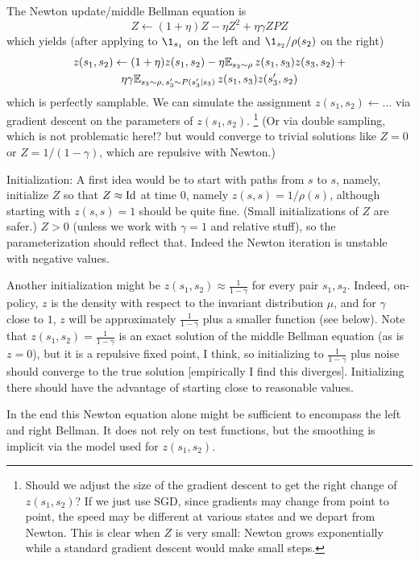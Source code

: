 \documentclass[11pt,a4paper]{article}
\begin{document}
The Newton update/middle Bellman equation is
\begin{equation}
Z\gets (1+\eta)Z-\eta Z^2+\eta \gamma ZPZ
\end{equation}
which yields (after applying to $\1_{s_1}$ on the left and $\1_{s_2}/\rho(s_2)$
on the right)
\begin{multline}
z(s_1,s_2)\gets (1+\eta)z(s_1,s_2)-\eta \mathbb{E}_{s_3\sim \rho}\,
z(s_1,s_3)z(s_3,s_2)\,+\\\eta \gamma \mathbb{E}_{s_3\sim\rho,\, s'_3\sim
P(s'_3|s_3)}\,
z(s_1,s_3)z(s'_3,s_2)
\end{multline}
which is perfectly samplable. We can simulate the assignment
$z(s_1,s_2)\gets...$ via gradient descent on the parameters of
$z(s_1,s_2)$. \footnote{Should we adjust the size of the gradient descent
to get the right change of $z(s_1,s_2)$? If we just use SGD, since
gradients may change from point to point, the speed may be different at
various states and we depart from Newton. This is clear when $Z$ is very
small: Newton grows exponentially while a standard gradient descent would
make small steps.} (Or via double sampling, which is not problematic
here!? but would converge to trivial solutions like $Z=0$ or
$Z=1/(1-\gamma)$, which are repulsive with Newton.)

Initialization: A first idea would be to start with paths from $s$ to
$s$, namely, initialize
$Z$ so that $Z\approx \operatorname{Id}$ at time
$0$, namely $z(s,s)=1/\rho(s)$, although starting with $z(s,s)=1$ should be
quite fine. (Small initializations of $Z$ are safer.) $Z>0$ (unless we
work with $\gamma=1$ and relative stuff), so the parameterization should
reflect that. Indeed the Newton iteration is unstable with negative
values.

Another initialization might be $z(s_1,s_2)\approx \frac{1}{1-\gamma}$
for every pair $s_1,s_2$. Indeed, on-policy, $z$ is the density with
respect to the invariant distribution $\mu$, and for $\gamma$ close to
$1$, $z$ will be approximately $\frac{1}{1-\gamma}$ plus a smaller function (see
below). Note that $z(s_1,s_2)=\frac{1}{1-\gamma}$ is an exact solution of
the middle Bellman equation (as is $z=0$), but it is a repulsive fixed
point, I think, so initializing to $\frac{1}{1-\gamma}$ plus noise should
converge to the true solution [empirically I find this diverges]. Initializing there should have the
advantage of starting close to reasonable values.

In the end this Newton equation alone might be sufficient to
encompass the left and right Bellman. It does not rely on test functions,
but the smoothing is implicit via the model used for $z(s_1,s_2)$.
\end{document}
